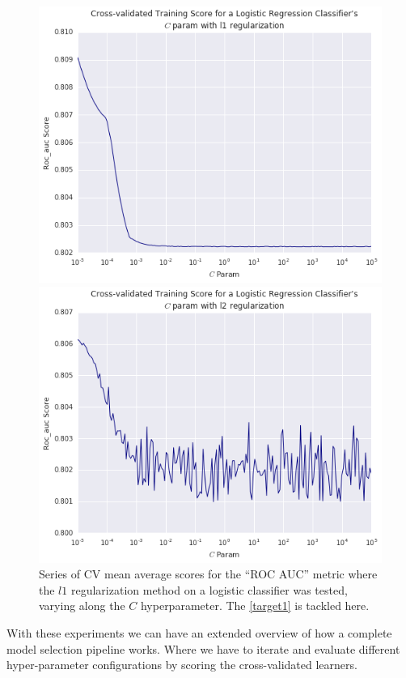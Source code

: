 \begin{figure}
\centering
\begin{minipage}{.5\textwidth}
  \includegraphics[width=1.2\linewidth]{figures/cross_validation/logreg_cv_regularization_l1_rocauc_series}
\end{minipage}%
\begin{minipage}{.5\textwidth}
  \includegraphics[width=1.2\linewidth]{figures/cross_validation/logreg_cv_regularization_l2_rocauc_series}
  \end{minipage}
\caption{Series of CV mean average scores for the ``ROC AUC'' metric where the $l1$ regularization method on a logistic classifier was tested, varying along the $C$ hyperparameter.
The \cref{target1} is tackled here.}\label{fig:rocauc_logreg_cv_regularized_comparison}
\end{figure}


With these experiments we can have an extended overview of how a complete model selection pipeline works. Where we have to iterate and evaluate different hyper-parameter configurations by scoring the cross-validated learners.	
